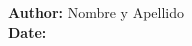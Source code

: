 \documentclass[12pt,twoside,openright,english,spanish]{toptesi}
\begin{document}
\pagebreak
\newpage



\vspace*{15cm}
\begin{flushright}
\textbf{Author:} Nombre y Apellido\hspace*{2cm}\\
\vspace{3cm}
\textbf{Date:\hspace*{4cm}}
\end{flushright}
\thispagestyle{empty}

\end{document}

